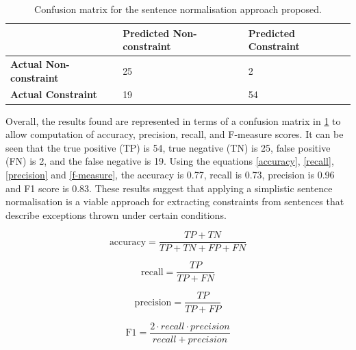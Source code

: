 \begin{table}[h]
	\centering
	\begin{tabular}{l|l|l|}
		\cline{2-3}
		& \textbf{Predicted Non-constraint} & \textbf{Predicted Constraint} \\ \hline
		\multicolumn{1}{|l|}{\textbf{Actual Non-constraint}} & 25 & 2 \\ \hline
		\multicolumn{1}{|l|}{\textbf{Actual Constraint}} & 19 & 54 \\ \hline
	\end{tabular}
	\caption{Confusion matrix for the sentence normalisation approach proposed.}
	\label{tab:conf-mat}
\end{table}

Overall, the results found are represented in terms of a confusion matrix in \ref{tab:conf-mat} to allow computation of accuracy, precision, recall, and F-measure scores. It can be seen that the true positive (TP) is 54, true negative (TN) is 25, false positive (FN) is 2, and the false negative is 19. Using the equations \ref{accuracy}, \ref{recall}, \ref{precision} and \ref{f-measure}, the accuracy is 0.77, recall is 0.73, precision is 0.96 and F1 score is 0.83. These results suggest that applying a simplistic sentence normalisation is a viable approach for extracting constraints from sentences that describe exceptions thrown under certain conditions. 

\begin{equation}
\label{accuracy}
\text{accuracy} = \frac{TP + TN}{TP + TN + FP + FN}
\end{equation}

\begin{equation}
\label{recall}
\text{recall}=\frac{TP}{TP + FN}
\end{equation}

\begin{equation}
\label{precision}
\text{precision}=\frac{TP}{TP + FP}
\end{equation}

\begin{equation}
\label{f-measure}
\text{F1}=\frac{2\cdot recall\cdot precision}{recall + precision}
\end{equation}

